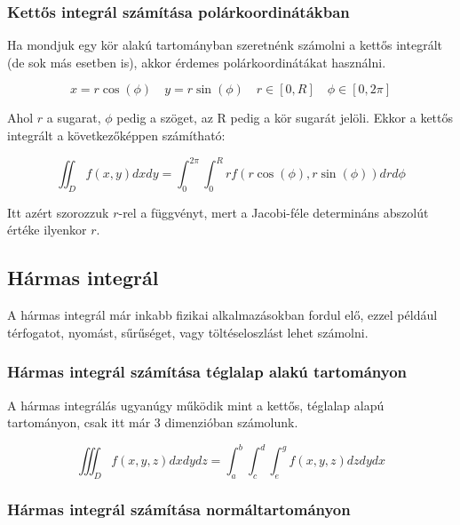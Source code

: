\documentclass{article}
\begin{document}
\subsubsection{Kettős integrál számítása polárkoordinátákban}

Ha mondjuk egy kör alakú tartományban szeretnénk számolni a kettős integrált (de sok más esetben is), akkor érdemes polárkoordinátákat használni.

\begin{equation*}
    x = r \cos(\phi) \quad y = r \sin(\phi) \quad r \in [0, R] \quad \phi \in [0, 2\pi]
\end{equation*}

Ahol $r$ a sugarat, $\phi$ pedig a szöget, az R pedig a kör sugarát jelöli. Ekkor a kettős integrált a következőképpen számítható:

\begin{equation*}
    \iint_{D} f(x,y) dx dy = \int_{0}^{2\pi} \int_{0}^{R} r f(r \cos(\phi), r \sin(\phi)) dr d\phi
\end{equation*}

Itt azért szorozzuk $r$-rel a függvényt, mert a Jacobi-féle determináns abszolút értéke ilyenkor $r$.

\newpage

\subsection{Hármas integrál}

A hármas integrál már inkabb fizikai alkalmazásokban fordul elő, ezzel például 
térfogatot, nyomást, sűrűséget, vagy töltéseloszlást lehet számolni.

\subsubsection{Hármas integrál számítása téglalap alakú tartományon}

A hármas integrálás ugyanúgy működik mint a kettős, téglalap alapú tar\-to\-mány\-on, csak itt már 3 dimenzióban számolunk.

\begin{equation*}
    \iiint_{D} f(x,y,z) dx dy dz = \int_{a}^{b} \int_{c}^{d} \int_{e}^{g} f(x,y,z) dz dy dx
\end{equation*}

\subsubsection{Hármas integrál számítása normáltartományon}
\end{document}
